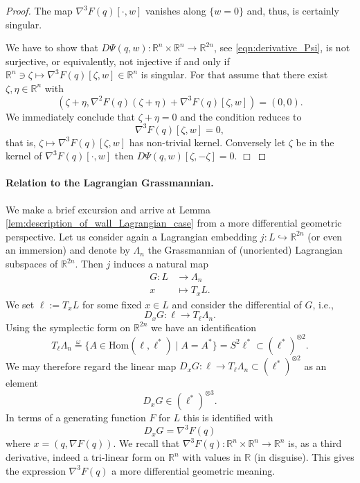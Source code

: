 \documentclass[12pt]{article}
\newcommand{\proofend}{$\Box$\bigskip}
\newcommand{\R}{{\mathbb R}}
\begin{document}
\begin{proof}
The map $\nabla^3F(q)[\cdot,w]$ vanishes along  $\{w=0\}$ and, thus, is certainly singular.

We have to show that $D\Psi(q,w):\R^n\times\R^n\to \R^{2n}$, see \eqref{eqn:derivative_Psi}, is not surjective, or equivalently, not injective if and only if $\R^n\ni\zeta\mapsto \nabla^3F(q)[\zeta,w]\in\R^n$ is singular. For that assume that there exist $\zeta,\eta\in\R^n$ with
\begin{equation}\nonumber
(\zeta+\eta,\nabla^2 F(q)(\zeta+\eta)+\nabla^3F(q)[\zeta,w])=(0,0).
\end{equation}
We immediately conclude that $\zeta+\eta=0$ and the condition reduces to
\begin{equation}\nonumber
\nabla^3F(q)[\zeta,w]=0,
\end{equation}
that is, $\zeta\mapsto \nabla^3F(q)[\zeta,w]$ has non-trivial kernel. Conversely let $\zeta$ be in the kernel of $\nabla^3F(q)[\cdot,w]$ then $D\Psi(q,w)[\zeta,-\zeta]=0$. \proofend 
\end{proof}

\paragraph{Relation to the Lagrangian Grassmannian.}
We make a brief excursion and arrive at Lemma \ref{lem:description_of_wall_Lagrangian_case} from a more differential geometric perspective. Let us consider again a Lagrangian embedding $j:L\hookrightarrow\R^{2n}$ (or even an immersion) and denote by $\Lambda_n$ the Grassmannian of (unoriented) Lagrangian subspaces of $\R^{2n}$. Then $j$ induces a natural map
\begin{equation}\nonumber
\begin{aligned}
G:L&\to\Lambda_n\\
x&\mapsto T_xL.
\end{aligned}
\end{equation}
We set $\ell:=T_xL$ for some fixed $x\in L$ and consider the differential of $G$, i.e.,
\begin{equation}\nonumber
D_xG:\ell\to T_\ell\Lambda_n.
\end{equation}
Using the symplectic form on $\R^{2n}$ we have an identification
\begin{equation}\nonumber
T_\ell\Lambda_n\stackrel{\omega}{=}\{A\in\mathrm{Hom}(\ell,\ell^*)\mid A=A^*\}=S^2\ell^*\subset(\ell^*)^{\otimes 2}.
\end{equation}
We may therefore regard the linear map $D_xG:\ell\to T_\ell\Lambda_n\subset(\ell^*)^{\otimes 2}$ as an element
\begin{equation}\nonumber
D_xG\in(\ell^*)^{\otimes 3}.
\end{equation}
In terms of a generating function $F$ for $L$ this is identified with
\begin{equation}\nonumber
D_xG=\nabla^3F(q)
\end{equation}
where $x=(q,\nabla F(q))$. We recall that $\nabla^3F(q):\R^n\times\R^n\to\R^n$ is, as a third derivative, indeed a tri-linear form on $\R^n$ with values in $\R$ (in disguise). This gives the expression $\nabla^3F(q)$ a more differential geometric meaning.
\end{document}
